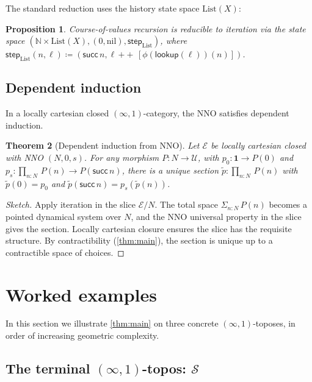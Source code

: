 \documentclass[12pt]{article}
\newtheorem{theorem}{Theorem}[section]
\newtheorem{proposition}[theorem]{Proposition}
\theoremstyle{definition}
\theoremstyle{remark}
\newcommand{\N}{\mathbb{N}}
\newcommand{\suc}{\mathsf{succ}}
\newcommand{\U}{\mathcal{U}}
\newcommand{\Spc}{\mathcal{S}}
\newcommand{\Sigmatype}{\Sigma}
\begin{document}
The standard reduction uses the history state space $\mathrm{List}(X)$:

\begin{proposition}\label{prop:cov-rec}
Course-of-values recursion is reducible to iteration via the state space $(\N\times \mathrm{List}(X), (0,\mathrm{nil}), \mathsf{step}_{\mathrm{List}})$, where $\mathsf{step}_{\mathrm{List}}(n,\ell)\coloneqq(\suc\,n,\ell\,\mathbin{++}\,[\phi(\mathsf{lookup}(\ell))(n)])$.
\end{proposition}

\subsection{Dependent induction}

In a locally cartesian closed $(\infty,1)$-category, the NNO satisfies dependent induction.

\begin{theorem}[Dependent induction from NNO]\label{thm:dep-ind}
Let $\mathcal{E}$ be locally cartesian closed with NNO $(N,0,s)$. For any morphism $P\colon N\to \U$, with $p_{0}\colon \mathbf{1}\to P(0)$ and $p_{s}\colon \prod_{n:N}\,P(n)\to P(\suc\,n)$, there is a unique section $\widetilde{p}\colon \prod_{n:N}\,P(n)$ with $\widetilde{p}(0)=p_{0}$ and $\widetilde{p}(\suc\,n)=p_{s}(\widetilde{p}(n))$.
\end{theorem}

\begin{proof}[Sketch]
Apply iteration in the slice $\mathcal{E}/N$. The total space $\Sigmatype_{n:N}\,P(n)$ becomes a pointed dynamical system over $N$, and the NNO universal property in the slice gives the section. Locally cartesian closure ensures the slice has the requisite structure. By contractibility (\cref{thm:main}), the section is unique up to a contractible space of choices.
\end{proof}

\section{Worked examples}\label{sec:examples}

In this section we illustrate \cref{thm:main} on three concrete $(\infty,1)$-toposes, in order of increasing geometric complexity.

\subsection{The terminal \texorpdfstring{$(\infty,1)$}{(infinity,1)}-topos: \texorpdfstring{$\Spc$}{spaces}}
\end{document}
